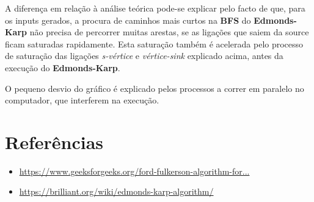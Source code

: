 \documentclass[12pt,a4paper]{article}
\begin{document}
A diferença em relação à análise teórica pode-se explicar pelo facto de que, para os inputs gerados, a procura de caminhos mais curtos
na \textbf{BFS} do \textbf{Edmonds-Karp} não precisa de percorrer muitas arestas, se as ligações que saiem da source ficam saturadas rapidamente.
Esta saturação também é acelerada pelo processo de saturação das ligações \textit{s-vértice} e \textit{vértice-sink} explicado acima, antes da execução do \textbf{Edmonds-Karp}.

O pequeno desvio do gráfico é explicado pelos processos a correr em paralelo no computador, que interferem na execução.

\section{Referências}
\begin{itemize}
	\item \href{https://www.geeksforgeeks.org/ford-fulkerson-algorithm-for-maximum-flow-problem/}{https://www.geeksforgeeks.org/ford-fulkerson-algorithm-for...}
	\item \href{https://brilliant.org/wiki/edmonds-karp-algorithm/}{https://brilliant.org/wiki/edmonds-karp-algorithm/}
\end{itemize}
\end{document}
